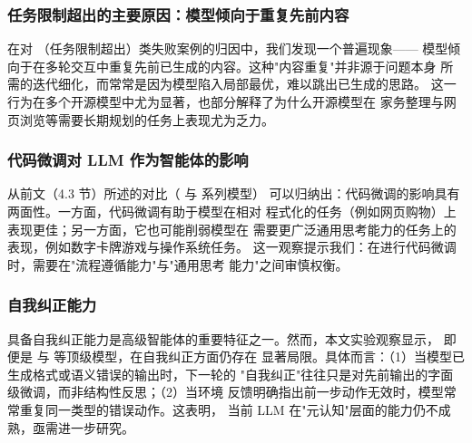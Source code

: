 \subsubsection{任务限制超出的主要原因：模型倾向于重复先前内容}

在对 （任务限制超出）类失败案例的归因中，我们发现一个普遍现象——
模型倾向于在多轮交互中重复先前已生成的内容。这种"内容重复"并非源于问题本身
所需的迭代细化，而常常是因为模型陷入局部最优，难以跳出已生成的思路。
这一行为在多个开源模型中尤为显著，也部分解释了为什么开源模型在
家务整理与网页浏览等需要长期规划的任务上表现尤为乏力。

\subsubsection{代码微调对 LLM 作为智能体的影响}

从前文（4.3 节）所述的对比（ 与  系列模型）
可以归纳出：代码微调的影响具有两面性。一方面，代码微调有助于模型在相对
程式化的任务（例如网页购物）上表现更佳；另一方面，它也可能削弱模型在
需要更广泛通用思考能力的任务上的表现，例如数字卡牌游戏与操作系统任务。
这一观察提示我们：在进行代码微调时，需要在"流程遵循能力"与"通用思考
能力"之间审慎权衡。

\subsubsection{自我纠正能力}

具备自我纠正能力是高级智能体的重要特征之一。然而，本文实验观察显示，
即便是  与  等顶级模型，在自我纠正方面仍存在
显著局限。具体而言：（1）当模型已生成格式或语义错误的输出时，下一轮的
"自我纠正"往往只是对先前输出的字面级微调，而非结构性反思；（2）当环境
反馈明确指出前一步动作无效时，模型常常重复同一类型的错误动作。这表明，
当前 LLM 在"元认知"层面的能力仍不成熟，亟需进一步研究。
